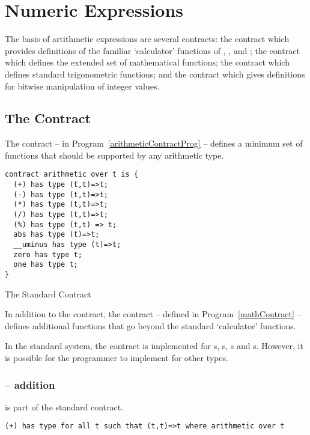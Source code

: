 \chapter{Numeric Expressions}
\label{numbers}

The basis of artithmetic expressions are several contracts: the  contract which provides definitions of the familiar `calculator' functions of \q{+}, \q{-}, \q{*} and \q{/}; the  contract which defines the extended set of mathematical functions; the  contract which defines standard trigonometric functions; and the  contract which gives definitions for bitwise manipulation of integer values.

\section{The  Contract}
\label{arithmeticContract}

The  contract -- in Program~\vref{arithmeticContractProg} -- defines a minimum set of functions that should be supported by any arithmetic type.

\begin{program}
\begin{lstlisting}
contract arithmetic over t is {
  (+) has type (t,t)=>t;
  (-) has type (t,t)=>t;
  (*) has type (t,t)=>t;
  (/) has type (t,t)=>t;
  (%) has type (t,t) => t;
  abs has type (t)=>t;
  __uminus has type (t)=>t;
  zero has type t;
  one has type t;
}
\end{lstlisting}
\caption{The Standard  Contract\label{arithmeticContractProg}}
\end{program}

In addition to the  contract, the  contract -- defined in Program~\vref{mathContract} -- defines additional functions that go beyond the standard `calculator' functions.

\begin{aside}
In the standard system, the  contract is implemented for s, s, s and s. However, it is possible for the programmer to implement  for other types.
\end{aside}

\subsection{\q{+} -- addition}
\label{plusFunction}
\q{+} is part of the standard  contract.
\begin{lstlisting}
(+) has type for all t such that (t,t)=>t where arithmetic over t
\end{lstlisting}

